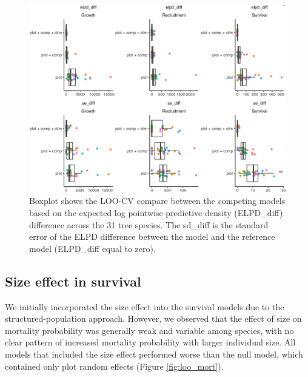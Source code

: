 \hypertarget{fig:loo}{%
\begin{figure}
\centering
\includegraphics{manuscript/figs/supp1_5.png}
\caption[{Boxplot shows the LOO-CV compare between the competing models
based on the expected log pointwise predictive density (ELPD\_diff)
difference across the 31 tree species.}]{Boxplot shows the LOO-CV
compare between the competing models based on the expected log pointwise
predictive density (ELPD\_diff) difference across the 31 tree species.
The sd\_diff is the standard error of the ELPD difference between the
model and the reference model (ELPD\_diff equal to zero).}
\label{fig:loo}
\end{figure}
}

\hypertarget{size-effect-in-survival}{%
\subsection{Size effect in survival}\label{size-effect-in-survival}}

We initially incorporated the size effect into the survival models due
to the structured-population approach. However, we observed that the
effect of size on mortality probability was generally weak and variable
among species, with no clear pattern of increased mortality probability
with larger individual size. All models that included the size effect
performed worse than the null model, which contained only plot random
effects (Figure \ref{fig:loo_mort}).\\

